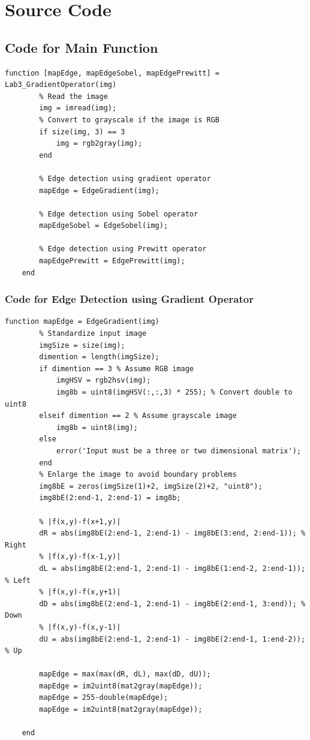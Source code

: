 \documentclass[a4paper,11pt]{article}
\begin{document}
\section{Source Code}
\subsection{Code for Main Function}
\lstset{language = Matlab}
    \begin{lstlisting}[basicstyle=\tiny]
    function [mapEdge, mapEdgeSobel, mapEdgePrewitt] = Lab3_GradientOperator(img)
        % Read the image
        img = imread(img);
        % Convert to grayscale if the image is RGB
        if size(img, 3) == 3
            img = rgb2gray(img);
        end
        
        % Edge detection using gradient operator
        mapEdge = EdgeGradient(img);
        
        % Edge detection using Sobel operator
        mapEdgeSobel = EdgeSobel(img);
        
        % Edge detection using Prewitt operator
        mapEdgePrewitt = EdgePrewitt(img);
    end
\end{lstlisting}

\subsubsection{Code for Edge Detection using Gradient Operator}
\lstset{language = Matlab}
    \begin{lstlisting}[basicstyle=\tiny]
    function mapEdge = EdgeGradient(img)
        % Standardize input image
        imgSize = size(img);
        dimention = length(imgSize);
        if dimention == 3 % Assume RGB image
            imgHSV = rgb2hsv(img);
            img8b = uint8(imgHSV(:,:,3) * 255); % Convert double to uint8
        elseif dimention == 2 % Assume grayscale image
            img8b = uint8(img);
        else
            error('Input must be a three or two dimensional matrix');
        end
        % Enlarge the image to avoid boundary problems
        img8bE = zeros(imgSize(1)+2, imgSize(2)+2, "uint8");
        img8bE(2:end-1, 2:end-1) = img8b;
        
        % |f(x,y)-f(x+1,y)|
        dR = abs(img8bE(2:end-1, 2:end-1) - img8bE(3:end, 2:end-1)); % Right
        % |f(x,y)-f(x-1,y)|
        dL = abs(img8bE(2:end-1, 2:end-1) - img8bE(1:end-2, 2:end-1)); % Left
        % |f(x,y)-f(x,y+1)|
        dD = abs(img8bE(2:end-1, 2:end-1) - img8bE(2:end-1, 3:end)); % Down
        % |f(x,y)-f(x,y-1)|
        dU = abs(img8bE(2:end-1, 2:end-1) - img8bE(2:end-1, 1:end-2)); % Up
    
        mapEdge = max(max(dR, dL), max(dD, dU));
        mapEdge = im2uint8(mat2gray(mapEdge));
        mapEdge = 255-double(mapEdge);
        mapEdge = im2uint8(mat2gray(mapEdge));
    
    end
\end{lstlisting}
\end{document}
